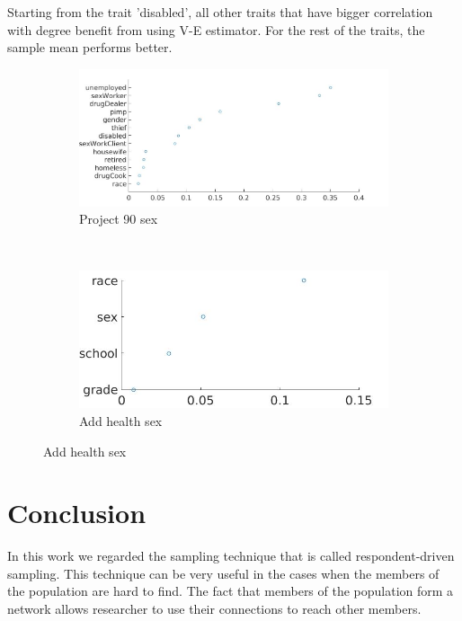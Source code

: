 \documentclass[12pt]{report}
\begin{document}
Starting from the trait 'disabled', all other traits that have bigger correlation with degree benefit from using V-E estimator. For the rest of the traits, the sample mean performs better. 



\begin{figure}[h]
\centering
    \begin{subfigure}[b]{0.6\textwidth}
        \includegraphics[width=\textwidth]{corrDegreePr90}
        \caption{ Project 90 sex}

    \end{subfigure}
    ~
    \begin{subfigure}[b]{0.3\textwidth}
        \includegraphics[width=\textwidth]{corrDegreeStud}
        \caption{ Add health sex }

    \end{subfigure}
\label{fig:degree-val}
\end{figure} 

\chapter*{Conclusion}


In this work we regarded the sampling technique that is called respondent-driven sampling. This technique can  be very useful in the cases when the members of the population are hard to find. The fact that members of the population form a network allows researcher to use their connections to reach other members.
\end{document}
